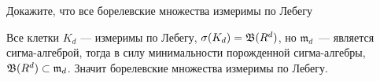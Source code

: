 \begin{task}{3}
	Докажите, что все борелевские множества измеримы по Лебегу
\end{task}

\begin{solution}
	
	Все клетки $K_d$ --- измеримы по Лебегу, 
	$\sigma(K_d) = \mathfrak{B}(R^d)$, но $\mathfrak{m}_d$~--- является сигма-алгеброй, 
	тогда в силу минимальности порожденной сигма-алгебры, $\mathfrak{B}(R^d) \subset \mathfrak{m}_d$. 
	Значит борелевские множества измеримы по Лебегу.
	
\end{solution}